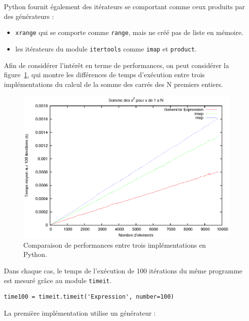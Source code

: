 \documentclass[a4paper]{article}
\begin{document}
Python fournit également des itérateurs se comportant comme ceux
produits par des générateurs :

\begin{itemize}
    \item \texttt{xrange} qui se comporte comme \texttt{range}, mais ne créé pas de liste en
  mémoire.
\item les itérateurs du module \texttt{itertools} comme \texttt{imap} et \texttt{product}.
\end{itemize}

Afin de considérer l'intérêt en terme de performances, on peut
considérer la figure~\ref{GenExpMapImapPy}, qui montre les différences
de temps d'exécution entre trois implémentations du calcul de la somme
des carrés des N premiers entiers.

\begin{figure}[h]
  \includegraphics[width=\textwidth]{./Pictures/GenExpMapImapPy}
  \caption{Comparaison de performances entre trois implémentations en Python.}
  \label{GenExpMapImapPy}
\end{figure}

Dans chaque cas, le temps de l'exécution de 100 itérations du même
programme est mesuré grâce au module \texttt{timeit}.

\begin{lstlisting}
time100 = timeit.timeit('Expression', number=100)
\end{lstlisting}

La première implémentation utilise un générateur :
\end{document}
